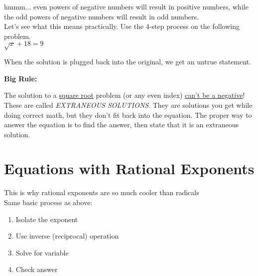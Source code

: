 \documentclass[12pt]{article}
\begin{document}
\vspace{1cm}

hmmm... even powers of negative numbers will result in positive numbers, while the odd powers of negative numbers will result in odd numbers. \\

Let's see what this means practically. Use the 4-step process on the following problem.\\

$\sqrt{x}+18=9$\\

\vspace{1in}

When the solution is plugged back into the original, we get an untrue statement.\\

\vspace{1cm}

\begin{large} \textbf{Big Rule:} \end{large} The solution to a \underline{square root} problem (or any even index) \underline{can't be a negative}!\\

These are called \textit{EXTRANEOUS SOLUTIONS}. They are solutions you get while doing correct math, but they don't fit back into the equation. The proper way to answer the equation is to find the answer, then state that it is an extraneous solution. 

\pagebreak



\section{Equations with Rational Exponents}

This is why rational exponents are so much cooler than radicals\\

Same basic process as above:

\begin{enumerate}

	\item Isolate the exponent
	
	\item Use inverse (reciprocal) operation
	
	\item Solve for variable
	
	\item Check answer
\end{enumerate}
\end{document}
